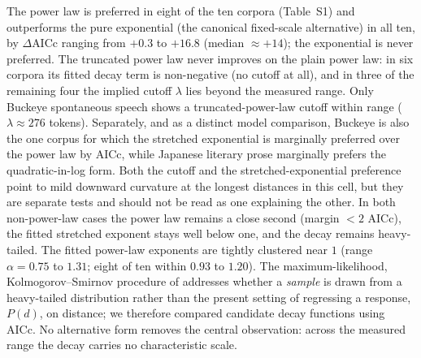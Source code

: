 \documentclass[11pt]{article}
\begin{document}
The power law is preferred in eight of the ten corpora (Table~S1) and outperforms the pure
exponential (the canonical fixed-scale alternative) in all ten, by $\Delta\text{AICc}$
ranging from $+0.3$ to $+16.8$ (median $\approx +14$); the exponential is never preferred. The
truncated power law never improves on the plain power law: in six corpora its fitted decay term
is non-negative (no cutoff at all), and in three of the remaining four the implied cutoff
$\lambda$ lies beyond the measured range. Only Buckeye spontaneous speech shows a truncated-power-law
cutoff within range ($\lambda \approx 276$ tokens). Separately, and as a distinct model comparison,
Buckeye is also the one corpus for which the stretched exponential is marginally preferred over the
power law by AICc, while Japanese literary prose marginally prefers the quadratic-in-log form. Both the
cutoff and the stretched-exponential preference point to mild downward curvature at the longest distances
in this cell, but they are separate tests and should not be read as one explaining the other. In both non-power-law cases the power law remains a
close second (margin $<2$ AICc), the fitted stretched exponent stays well below one, and the decay
remains heavy-tailed. The fitted power-law exponents
are tightly clustered near $1$ (range $\alpha=0.75$ to $1.31$; eight of ten within $0.93$ to $1.20$).
The maximum-likelihood, Kolmogorov--Smirnov procedure of \citet{clauset2009power} addresses
whether a \emph{sample} is drawn from a heavy-tailed distribution rather than the present
setting of regressing a response, $P(d)$, on distance; we therefore compared candidate decay
functions using AICc. No alternative form removes the central observation: across the measured
range the decay carries no characteristic scale.
\end{document}

